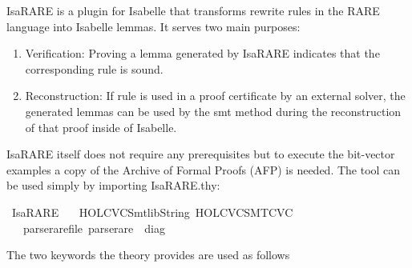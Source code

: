 %
\begin{isabellebody}%
%
%
\isadelimdocument
%
\endisadelimdocument
%
\isatagdocument
%
\isamarkuptrue%
%
\endisatagdocument
{\isafolddocument}%
%
\isadelimdocument
%
\endisadelimdocument
%
\begin{isamarkuptext}%
IsaRARE is a plugin for Isabelle that transforms rewrite rules in the RARE language into Isabelle
lemmas. It serves two main purposes:

\begin{enumerate}
\item Verification:
 Proving a lemma generated by IsaRARE indicates that the corresponding rule is sound. 

\item Reconstruction:
 If rule is used in a proof certificate by an external solver, the generated lemmas can be used by
 the smt method during the reconstruction of that proof inside of Isabelle. 
\end{enumerate}%
\end{isamarkuptext}\isamarkuptrue%
%
\isadelimdocument
%
\endisadelimdocument
%
\isatagdocument
%
\isamarkuptrue%
%
\endisatagdocument
{\isafolddocument}%
%
\isadelimdocument
%
\endisadelimdocument
%
\begin{isamarkuptext}%
IsaRARE itself does not require any prerequisites but to execute the bit-vector examples a copy of
the Archive of Formal Proofs (AFP) is needed. The tool can be used simply by importing IsaRARE.thy:%
\end{isamarkuptext}\isamarkuptrue%
%
\isadelimtheory
%
\endisadelimtheory
%
\isatagtheory
{}\isamarkupfalse%
\ IsaRARE\isanewline
\ \ \ {\isachardoublequoteopen}HOL{\isacharminus}{\kern0pt}CVC{\isachardot}{\kern0pt}Smtlib{\isacharunderscore}{\kern0pt}String{\isachardoublequoteclose}\ {\isachardoublequoteopen}HOL{\isacharminus}{\kern0pt}CVC{\isachardot}{\kern0pt}SMT{\isacharunderscore}{\kern0pt}CVC{\isachardoublequoteclose}\isanewline
\ \ \ {\isachardoublequoteopen}parse{\isacharunderscore}{\kern0pt}rare{\isacharunderscore}{\kern0pt}file{\isachardoublequoteclose}\ {\isachardoublequoteopen}parse{\isacharunderscore}{\kern0pt}rare{\isachardoublequoteclose}\ {\isacharcolon}{\kern0pt}{\isacharcolon}{\kern0pt}\ diag\isanewline
{}%
\endisatagtheory
{\isafoldtheory}%
%
\isadelimtheory
%
\endisadelimtheory
%
\begin{isamarkuptext}%
The two keywords the theory provides are used as follows


\end{isamarkuptext}
\end{isabellebody}
